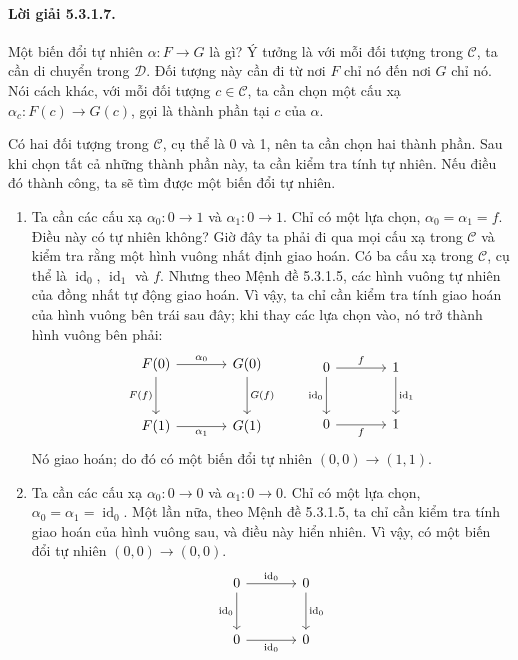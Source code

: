 \paragraph{Lời giải 5.3.1.7.} Một biến đổi tự nhiên $\alpha:F\to G$ là gì? Ý tưởng là với mỗi đối tượng trong $\mathcal C$, ta cần di chuyển trong $\mathcal D$. Đối tượng này cần đi từ nơi $F$ chỉ nó đến nơi $G$ chỉ
nó. Nói cách khác, với mỗi đối tượng $c\in\mathcal C$, ta cần chọn một cấu xạ $\alpha_c:F(c)\to G(c)$, gọi là thành phần tại $c$ của $\alpha$.

Có hai đối tượng trong $\mathcal C$, cụ thể là 0 và 1, nên ta cần chọn hai thành phần. Sau khi chọn tất cả những thành phần này, ta cần kiểm tra tính tự nhiên. Nếu điều đó thành công, ta sẽ tìm được một biến đổi tự nhiên.
\begin{enumerate}[label=\alph*.]
\item Ta cần các cấu xạ $\alpha_0:0\to1$ và $\alpha_1:0\to1$. Chỉ có một lựa chọn, $\alpha_0=\alpha_1=f$. Điều này có tự nhiên không? Giờ đây ta phải đi qua mọi cấu xạ trong $\mathcal C$ và kiểm tra rằng một hình vuông nhất định giao hoán. Có ba cấu xạ trong $\mathcal C$, cụ thể là $\operatorname{id}_0$, $\operatorname{id}_1$ và $f$. Nhưng theo Mệnh đề 5.3.1.5, các hình vuông tự nhiên của đồng nhất tự động giao hoán. Vì vậy, ta chỉ cần kiểm tra tính giao hoán của hình vuông bên trái sau đây; khi thay các lựa chọn vào, nó trở thành hình vuông bên phải:
\[\begin{tikzcd}[column sep=large,row sep=large]
F(0)\arrow[r,"\alpha_0"]\arrow[d,"F(f)"']&G(0)\arrow[d,"G(f)"]\\F(1)\arrow[r,"\alpha_1"']&G(1)
\end{tikzcd}\qquad\begin{tikzcd}[column sep=large,row sep=large]
0\arrow[r,"f"]\arrow[d,"\operatorname{id}_0"']&1\arrow[d,"\operatorname{id}_1"]\\0\arrow[r,"f"']&1
\end{tikzcd}\]
Nó giao hoán; do đó có một biến đổi tự nhiên $(0,0)\to(1,1)$.
\item Ta cần các cấu xạ $\alpha_0:0\to0$ và $\alpha_1:0\to0$. Chỉ có một lựa chọn, $\alpha_0=\alpha_1=\operatorname{id}_0$. Một lần nữa, theo Mệnh đề 5.3.1.5, ta chỉ cần kiểm tra tính giao hoán của hình vuông sau, và điều này hiển nhiên. Vì vậy, có một biến đổi tự nhiên $(0,0)\to(0,0)$.
\[\begin{tikzcd}[column sep=large,row sep=large]
0\arrow[r,"\operatorname{id}_0"]\arrow[d,"\operatorname{id}_0"']&0\arrow[d,"\operatorname{id}_0"]\\0\arrow[r,"\operatorname{id}_0"']&0

\end{tikzcd}\]
\end{enumerate}
